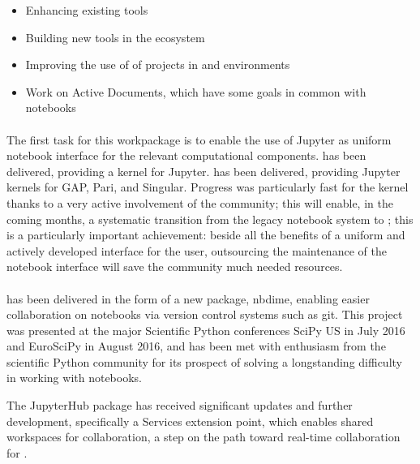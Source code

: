 \documentclass{deliverablereport}
\begin{document}
\begin{itemize}
    \item Enhancing existing \Jupyter tools
    \item Building new tools in the \Jupyter ecosystem
    \item Improving the use of of \ODK projects in \Jupyter and \Sage environments
    \item Work on Active Documents, which have some goals in common with \Jupyter notebooks
\end{itemize}

\paragraph{}

The first task for this workpackage is to enable the use of Jupyter as uniform notebook interface
for the relevant computational components.  has been
delivered, providing a \Sage kernel for Jupyter.  has been
delivered, providing Jupyter kernels for GAP, Pari, and Singular. Progress was
particularly fast for the \Sage kernel thanks to a very active involvement of the community; this
will enable, in the coming months, a systematic transition from the legacy \Sage notebook system to
\Jupyter; this is a particularly important achievement: beside all the benefits of a uniform and
actively developed interface for the user, outsourcing the maintenance of the notebook interface
will save the \Sage community much needed resources.


\paragraph{}

 has been delivered in the form of a new \Jupyter package, nbdime,
enabling easier collaboration on notebooks via version control systems such as git. This project
was presented at the major Scientific Python conferences SciPy US in July 2016 and EuroSciPy in August 2016,
and has been met with enthusiasm from the scientific Python community for its prospect of solving a
longstanding difficulty in working with notebooks.

The JupyterHub package has received significant updates and further development, specifically a
Services extension point, which enables shared workspaces for collaboration, a step on the path
toward real-time collaboration for .
\end{document}
